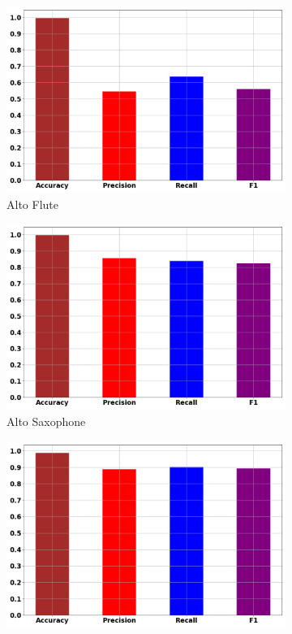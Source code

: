 \documentclass[12pt,letterpaper]{article}
\begin{document}
\begin{figure}[H]

	\begin{subfigure}[b]{0.45\textwidth}
	\centering
	\includegraphics[width=\textwidth]{../FiguresClasses/AltoFlute}
	\caption{Alto Flute}
	\end{subfigure}	
	\begin{subfigure}[b]{0.45\textwidth}
	\centering
	\includegraphics[width=\textwidth]{../FiguresClasses/AltoSax}
	\caption{Alto Saxophone}
	\end{subfigure}	
	\begin{subfigure}[b]{0.45\textwidth}
	\centering
	\includegraphics[width=\textwidth]{../FiguresClasses/BbClarinet}

\end{subfigure}
\end{figure}
\end{document}

